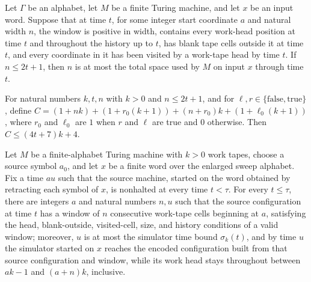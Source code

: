 \begin{lemma}
\label{Turing.FinTM.dgWindow_space}
\leanok
{}
Let $\Gamma$ be an alphabet, let $M$ be a finite Turing machine, and let $x$ be an input
word. Suppose that at time $t$, for some integer start coordinate $a$ and natural width
$n$, the window is positive in width, contains every work-head position at time $t$ and
throughout the history up to $t$, has blank tape cells outside it at time $t$, and every
coordinate in it has been visited by a work-tape head by time $t$. If $n\le 2t+1$, then
$n$ is at most the total space used by $M$ on input $x$ through time $t$.
\end{lemma}

\begin{lemma}
\label{Turing.FinTM.dgCost_le}
\leanok
{}
For natural numbers $k,t,n$ with $k>0$ and $n\le 2t+1$, and for
$\ell,r\in\{\mathrm{false},\mathrm{true}\}$, define
$C=(1+nk)+(1+r_0(k+1))+(n+r_0)k+(1+\ell_0(k+1))$, where $r_0$ and $\ell_0$ are $1$ when
$r$ and $\ell$ are true and $0$ otherwise. Then $C\le (4t+7)k+4$.
\end{lemma}

\begin{lemma}
\label{Turing.FinTM.dg_simulate}
\leanok
{}
Let $M$ be a finite-alphabet Turing machine with $k>0$ work tapes, choose a source
symbol $a_0$, and let $x$ be a finite word over the enlarged sweep alphabet. Fix a time
$	au$ such that the source machine, started on the word obtained by retracting each
symbol of $x$, is nonhalted at every time $t<\tau$. For every $t\le\tau$, there are
integers $a$ and natural numbers $n,u$ such that the source configuration at time $t$
has a window of $n$ consecutive work-tape cells beginning at $a$, satisfying the head,
blank-outside, visited-cell, size, and history conditions of a valid window; moreover,
$u$ is at most the simulator time bound $\sigma_k(t)$, and by time $u$ the simulator
started on $x$ reaches the encoded configuration built from that source configuration
and window, while its work head stays throughout between $ak-1$ and $(a+n)k$, inclusive.
\end{lemma}

